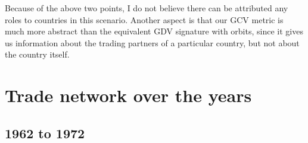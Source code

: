 \documentclass[11pt,a4paper,oneside]{report}
\begin{document}
Because of the above two points, I do not believe there can be attributed any roles to countries in this scenario. Another aspect is that our GCV metric is much more abstract than the equivalent GDV signature with orbits, since it gives us information about the trading partners of a particular country, but not about the country itself.


\section*{Trade network over the years}

\subsection*{1962 to 1972}

\begin{figure}[H]
  \centering
  \label{fig:asafa}
  

\end{figure}
\end{document}
